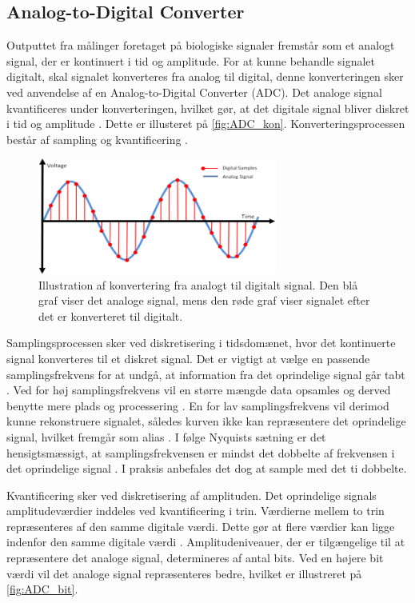\subsection{Analog-to-Digital Converter} \label{sec:ADC_teori}
Outputtet fra målinger foretaget på biologiske signaler fremstår som et analogt signal, der er kontinuert i tid og amplitude. For at kunne behandle signalet digitalt, skal signalet konverteres fra analog til digital, denne konverteringen sker ved anvendelse af en Analog-to-Digital Converter (ADC). Det analoge signal kvantificeres under konverteringen, hvilket gør, at det digitale signal bliver diskret i tid og amplitude \citep{webster1998}. Dette er illusteret på \autoref{fig:ADC_kon}. Konverteringsprocessen består af sampling og kvantificering \citep{morre2003}. 

\begin{figure}[H]
\centering
\includegraphics[width=0.7\textwidth]{figures/problemloesning/adc}
\caption{Illustration af konvertering fra analogt til digitalt signal. Den blå graf viser det analoge signal, mens den røde graf viser signalet efter det er konverteret til digitalt.}
\label{fig:ADC_kon}
\end{figure}

\noindent
Samplingsprocessen sker ved diskretisering i tidsdomænet, hvor det kontinuerte signal konverteres til et diskret signal. Det er vigtigt at vælge en passende samplingsfrekvens for at undgå, at information fra det oprindelige signal går tabt \citep{morre2003}. Ved for høj samplingsfrekvens vil en større mængde data opsamles og derved benytte mere plads og processering \citep{wolf2004}. En for lav samplingsfrekvens vil derimod kunne rekonstruere signalet, således kurven ikke kan repræsentere det oprindelige signal, hvilket fremgår som alias \citep{morre2003}. I følge Nyquists sætning er det hensigtsmæssigt, at samplingsfrekvensen er mindst det dobbelte af frekvensen i det oprindelige signal \citep{morre2003}. I praksis anbefales det dog at sample med det ti dobbelte.

Kvantificering sker ved diskretisering af amplituden. Det oprindelige signals amplitudeværdier inddeles ved kvantificering i trin. Værdierne mellem to trin repræsenteres af den samme digitale værdi. Dette gør at flere værdier kan ligge indenfor den samme digitale værdi \citep{morre2003}. Amplitudeniveauer, der er tilgængelige til at repræsentere det analoge signal, determineres af antal bits. Ved en højere bit værdi vil det analoge signal repræsenteres bedre, hvilket er illustreret på \autoref{fig:ADC_bit}.

